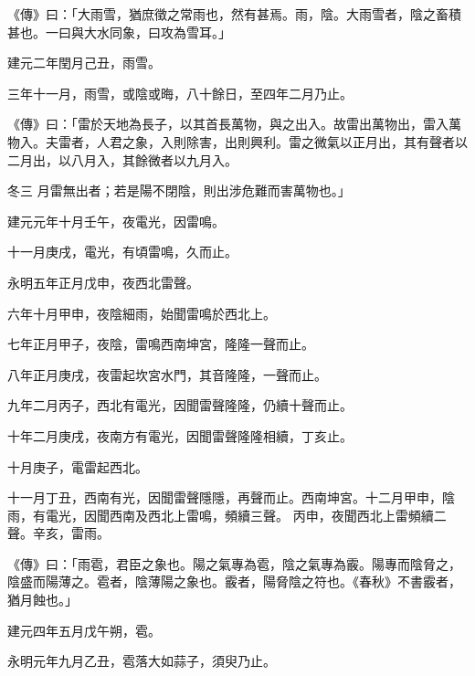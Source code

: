 \begin{pinyinscope}
 《傳》曰：「大雨雪，猶庶徵之常雨也，然有甚焉。雨，陰。大雨雪者，陰之畜積甚也。一曰與大水同象，曰攻為雪耳。」



 建元二年閏月己丑，雨雪。



 三年十一月，雨雪，或陰或晦，八十餘日，至四年二月乃止。



 《傳》曰：「雷於天地為長子，以其首長萬物，與之出入。故雷出萬物出，雷入萬物入。夫雷者，人君之象，入則除害，出則興利。雷之微氣以正月出，其有聲者以二月出，以八月入，其餘微者以九月入。



 冬三
 月雷無出者；若是陽不閉陰，則出涉危難而害萬物也。」



 建元元年十月壬午，夜電光，因雷鳴。



 十一月庚戌，電光，有頃雷鳴，久而止。



 永明五年正月戊申，夜西北雷聲。



 六年十月甲申，夜陰細雨，始聞雷鳴於西北上。



 七年正月甲子，夜陰，雷鳴西南坤宮，隆隆一聲而止。



 八年正月庚戌，夜雷起坎宮水門，其音隆隆，一聲而止。



 九年二月丙子，西北有電光，因聞雷聲隆隆，仍續十聲而止。



 十年二月庚戌，夜南方有電光，因聞雷聲隆隆相續，丁亥止。



 十月庚子，電雷起西北。



 十一月丁丑，西南有光，因聞雷聲隱隱，再聲而止。西南坤宮。十二月甲申，陰雨，有電光，因聞西南及西北上雷鳴，頻續三聲。
 丙申，夜聞西北上雷頻續二聲。辛亥，雷雨。



 《傳》曰：「雨雹，君臣之象也。陽之氣專為雹，陰之氣專為霰。陽專而陰脅之，陰盛而陽薄之。雹者，陰薄陽之象也。霰者，陽脅陰之符也。《春秋》不書霰者，猶月蝕也。」



 建元四年五月戊午朔，雹。



 永明元年九月乙丑，雹落大如蒜子，須臾乃止。




\end{pinyinscope}
